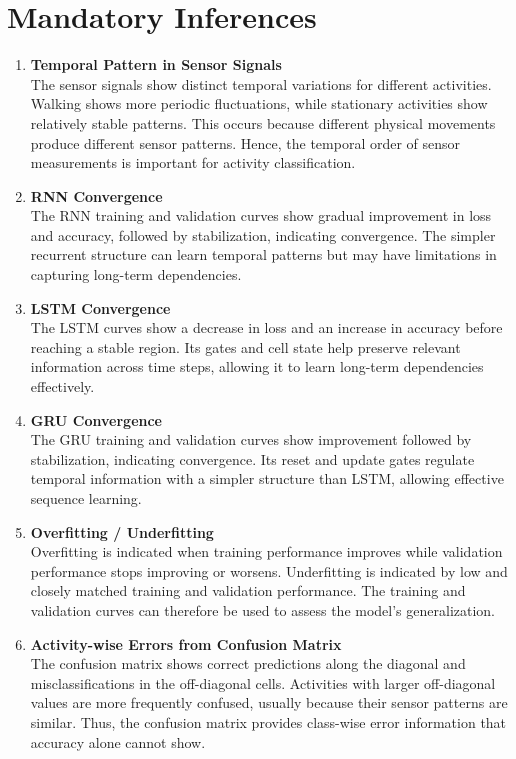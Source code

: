 \documentclass[10pt]{article}
\begin{document}
\section*{Mandatory Inferences}

\begin{enumerate}

\item \textbf{Temporal Pattern in Sensor Signals}\\
The sensor signals show distinct temporal variations for different activities. Walking shows more periodic fluctuations, while stationary activities show relatively stable patterns. This occurs because different physical movements produce different sensor patterns. Hence, the temporal order of sensor measurements is important for activity classification.

\item \textbf{RNN Convergence}\\
The RNN training and validation curves show gradual improvement in loss and accuracy, followed by stabilization, indicating convergence. The simpler recurrent structure can learn temporal patterns but may have limitations in capturing long-term dependencies.

\item \textbf{LSTM Convergence}\\
The LSTM curves show a decrease in loss and an increase in accuracy before reaching a stable region. Its gates and cell state help preserve relevant information across time steps, allowing it to learn long-term dependencies effectively.

\item \textbf{GRU Convergence}\\
The GRU training and validation curves show improvement followed by stabilization, indicating convergence. Its reset and update gates regulate temporal information with a simpler structure than LSTM, allowing effective sequence learning.

\item \textbf{Overfitting / Underfitting}\\
Overfitting is indicated when training performance improves while validation performance stops improving or worsens. Underfitting is indicated by low and closely matched training and validation performance. The training and validation curves can therefore be used to assess the model's generalization.

\item \textbf{Activity-wise Errors from Confusion Matrix}\\
The confusion matrix shows correct predictions along the diagonal and misclassifications in the off-diagonal cells. Activities with larger off-diagonal values are more frequently confused, usually because their sensor patterns are similar. Thus, the confusion matrix provides class-wise error information that accuracy alone cannot show.


\end{enumerate}
\end{document}
